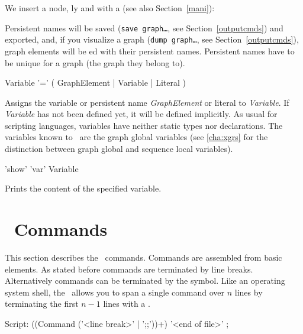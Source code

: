 \begin{example}
\label{persistentex} 
We insert a node, ly and with a  (see also Section~\ref{mani}):
\end{example}
\begin{note}
Persistent names will be saved (\texttt{save graph\dots}, see Section~\ref{outputcmds}) and exported, 
and, if you visualize a graph (\texttt{dump graph\dots}, see Section~\ref{outputcmds}), 
graph elements will be ed with their persistent names.
Persistent names have to be unique for a graph (the graph they belong to).
\end{note}

\begin{rail}
  Variable '=' ( GraphElement | Variable | Literal )
\end{rail}
Assigns the variable or persistent name \emph{GraphElement} or literal to \emph{Variable}.
If \emph{Variable} has not been defined yet, it will be defined implicitly.
As usual for scripting languages, variables have neither static types nor declarations.
The variables known to \GrShell\ are the graph global variables (see \ref{cha:xgrs} for the distinction between graph global and sequence local variables).

\begin{rail} 
'show' 'var' Variable 
\end{rail}
Prints the content of the specified variable.


\section{\GrShell\ Commands}
This section describes the \GrShell\ commands. Commands are assembled from basic elements. 
As stated before commands are terminated by line breaks. Alternatively commands can be terminated by the \indexed{\texttt{;;}} symbol.
Like an operating system shell, the \GrShell\ allows you to span a single command over $n$ lines by terminating the first $n-1$ lines with a .  
\begin{rail}
  Script: ((Command ('<line break>' | ';;'))+) '<end of file>' ;
\end{rail}

